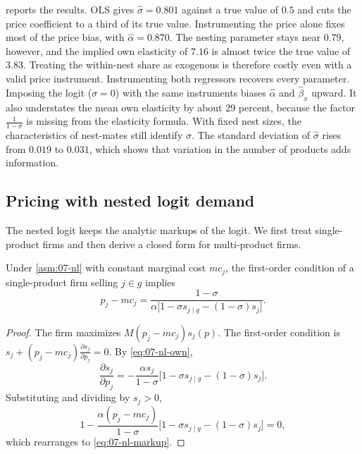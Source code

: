  reports the results. OLS gives $\hat\sigma = 0.801$ against a true value of $0.5$ and cuts
the price coefficient to a third of its true value. Instrumenting the price alone fixes most of the price bias,
with $\hat\alpha = 0.870$. The nesting parameter stays near $0.79$, however, and the implied own elasticity of
$7.16$ is almost twice the true value of $3.83$. Treating the within-nest share as exogenous is therefore costly
even with a valid price instrument. Instrumenting both regressors recovers every parameter. Imposing the logit
($\sigma = 0$) with the same instruments biases $\hat\alpha$ and $\hat\beta_x$ upward. It also understates the mean
own elasticity by about 29 percent, because the factor $\frac{1}{1-\sigma}$ is missing from the elasticity formula.
With fixed nest sizes, the characteristics of nest-mates still identify $\sigma$. The standard deviation of
$\hat\sigma$ rises from $0.019$ to $0.031$, which shows that variation in the number of products adds
information.

\subsection{Pricing with nested logit demand}\label{sec:07-nl-pricing}

The nested logit keeps the analytic markups of the logit. We first treat single-product firms and then derive a
closed form for multi-product firms.

\begin{proposition}\label{prop:07-nl-markup}
Under \cref{asm:07-nl} with constant marginal cost $mc_j$, the first-order condition of a single-product firm
selling $j \in g$ implies
\begin{equation}\label{eq:07-nl-markup}
p_j - mc_j = \frac{1-\sigma}{\alpha\big[1 - \sigma s_{j \mid g} - (1-\sigma)s_j\big]} .
\end{equation}
\end{proposition}

\begin{proof}
The firm maximizes $M(p_j - mc_j)s_j(p)$. The first-order condition is
$s_j + (p_j - mc_j)\frac{\partial s_j}{\partial p_j} = 0$. By \eqref{eq:07-nl-own},
\begin{equation*}
\frac{\partial s_j}{\partial p_j} = -\frac{\alpha s_j}{1-\sigma}\big[1 - \sigma s_{j \mid g} - (1-\sigma)s_j\big] .
\end{equation*}
Substituting and dividing by $s_j > 0$,
\begin{equation*}
1 - \frac{\alpha(p_j - mc_j)}{1-\sigma}\big[1 - \sigma s_{j \mid g} - (1-\sigma)s_j\big] = 0 ,
\end{equation*}
which rearranges to \eqref{eq:07-nl-markup}.
\end{proof}

